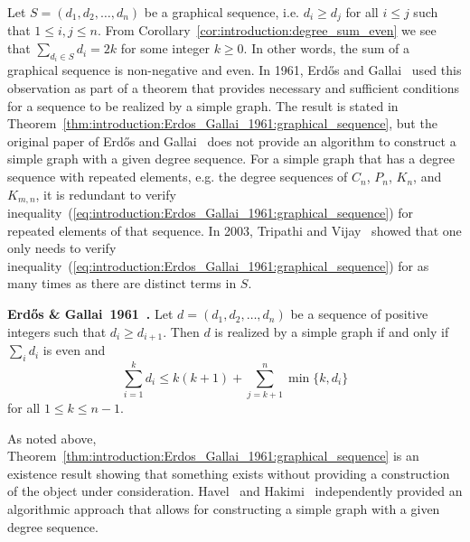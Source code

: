 Let $S = (d_1, d_2, \dots, d_n)$ be a graphical sequence, i.e.
$d_i \geq d_j$ for all $i \leq j$ such that $1 \leq i, j \leq n$. From
Corollary~\ref{cor:introduction:degree_sum_even} we see that
$\sum_{d_i \in S} d_i = 2k$ for some integer $k \geq 0$. In other
words, the sum of a graphical sequence is non-negative and
even. In 1961, Erd\H{o}s and Gallai~\cite{ErdosGallai1961} used this
observation as part of a theorem that provides necessary and
sufficient conditions for a sequence to be realized by a simple
graph. The result is stated in
Theorem~\ref{thm:introduction:Erdos_Gallai_1961:graphical_sequence},
but the original paper of Erd\H{o}s and Gallai~\cite{ErdosGallai1961}
does not provide an algorithm to construct a simple graph with a given
degree sequence. For a simple graph that has a degree sequence with
repeated elements, e.g. the degree sequences of $C_n$, $P_n$, $K_n$,
and $K_{m,n}$, it is redundant to verify
inequality~(\ref{eq:introduction:Erdos_Gallai_1961:graphical_sequence})
for repeated elements of that sequence. In 2003, Tripathi and
Vijay~\cite{TripathiVijay2003} showed that one only needs to verify
inequality~(\ref{eq:introduction:Erdos_Gallai_1961:graphical_sequence})
for as many times as there are distinct terms in $S$.

\begin{theorem}
\label{thm:introduction:Erdos_Gallai_1961:graphical_sequence}
\textbf{Erd\H{o}s \& Gallai~1961~\cite{ErdosGallai1961}.}
Let $d = (d_1, d_2, \dots, d_n)$ be a sequence of positive integers
such that $d_i \geq d_{i+1}$. Then $d$ is realized by a simple graph
if and only if $\sum_i d_i$ is even and
%
\begin{equation}
\label{eq:introduction:Erdos_Gallai_1961:graphical_sequence}
\sum_{i=1}^k d_i
\leq
k(k + 1) + \sum_{j=k+1}^n \min\{k, d_i\}
\end{equation}
%
for all $1 \leq k \leq n - 1$.
\end{theorem}

As noted above,
Theorem~\ref{thm:introduction:Erdos_Gallai_1961:graphical_sequence} is
an existence result showing that something exists without providing a
construction of the object under consideration. Havel~\cite{Havel1955}
and Hakimi~\cite{Hakimi1962,Hakimi1963} independently provided an
algorithmic approach that allows for constructing a simple graph with
a given degree sequence.

